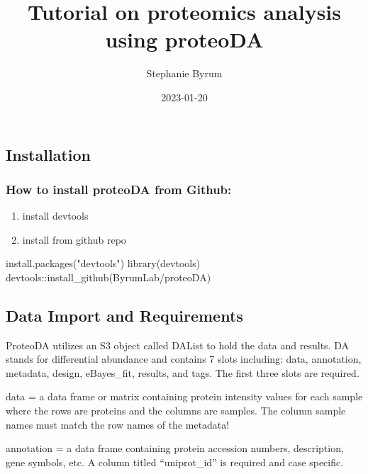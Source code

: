 \documentclass[
]{article}
\title{Tutorial on proteomics analysis using proteoDA}
\author{Stephanie Byrum}
\date{2023-01-20}
\newenvironment{Shaded}{\begin{snugshade}}{\end{snugshade}}
\newcommand{\FunctionTok}[1]{\textcolor[rgb]{0.00,0.00,0.00}{#1}}
\newcommand{\NormalTok}[1]{#1}
\newcommand{\SpecialCharTok}[1]{\textcolor[rgb]{0.00,0.00,0.00}{#1}}
\newcommand{\StringTok}[1]{\textcolor[rgb]{0.31,0.60,0.02}{#1}}
\providecommand{\tightlist}{%
  \setlength{\itemsep}{0pt}\setlength{\parskip}{0pt}}
\begin{document}
\maketitle

\hypertarget{installation}{%
\subsection{Installation}\label{installation}}

\hypertarget{how-to-install-proteoda-from-github}{%
\subsubsection{How to install proteoDA from
Github:}\label{how-to-install-proteoda-from-github}}

\begin{enumerate}
\def\labelenumi{\arabic{enumi}.}
\tightlist
\item
  install devtools
\item
  install from github repo
\end{enumerate}

\begin{Shaded}
\begin{Highlighting}[]
\FunctionTok{install.packages}\NormalTok{(}\StringTok{"devtools"}\NormalTok{)}
\FunctionTok{library}\NormalTok{(devtools)}
\NormalTok{devtools}\SpecialCharTok{::}\FunctionTok{install\_github}\NormalTok{(ByrumLab}\SpecialCharTok{/}\NormalTok{proteoDA)}
\end{Highlighting}
\end{Shaded}

\hypertarget{data-import-and-requirements}{%
\subsection{Data Import and
Requirements}\label{data-import-and-requirements}}

ProteoDA utilizes an S3 object called DAList to hold the data and
results. DA stands for differential abundance and contains 7 slots
including: data, annotation, metadata, design, eBayes\_fit, results, and
tags. The first three slots are required.

data = a data frame or matrix containing protein intensity values for
each sample where the rows are proteins and the columns are samples. The
column sample names must match the row names of the metadata!

annotation = a data frame containing protein accession numbers,
description, gene symbols, etc. A column titled ``uniprot\_id'' is
required and case specific.
\end{document}
